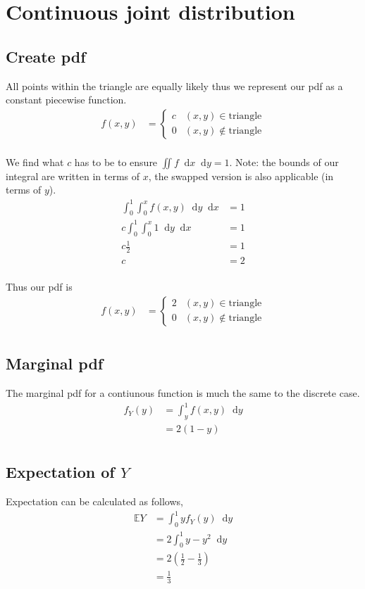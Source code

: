 \documentclass{article}
\newcommand{\diff}{\mathop{}\!\mathrm{d}}
\newcommand{\expect}{\mathbb{E}}
\begin{document}
\section{Continuous joint distribution}
\subsection{Create pdf}
All points within the triangle are equally likely thus we represent our
pdf as a constant piecewise function.
\begin{align*}
    f(x,y)
    &=
    \begin{cases}
        c & (x,y) \in \text{triangle} \\
        0 & (x,y) \notin \text{triangle}
    \end{cases} \\
\end{align*}

We find what $c$ has to be to ensure $\iint f \diff x \diff y = 1$.
Note: the bounds of our integral are written in terms of $x$, the swapped
version is also applicable (in terms of $y$).
\begin{align*}
    \int_0^1 \int_0^x f(x,y) \diff y \diff x &= 1 \\
    c \int_0^1 \int_0^x 1 \diff y \diff x &= 1 \\
    c \frac{1}{2} &= 1 \\
    c &= 2 \\
\end{align*}

Thus our pdf is 
\begin{align*}
    f(x,y)
    &=
    \begin{cases}
        2 & (x,y) \in \text{triangle} \\
        0 & (x,y) \notin \text{triangle}
    \end{cases} \\
\end{align*}

\subsection{Marginal pdf}
The marginal pdf for a contiunous function is much the same to the discrete
case.
\begin{align*}
    f_Y(y) &= \int_y^1 f(x,y) \diff y \\
    &= 2(1-y) \\
\end{align*}

\subsection{Expectation of $Y$}
Expectation can be calculated as follows,
\begin{align*}
    \expect Y &= \int_0^1 y f_Y(y) \diff y \\
    &= 2 \int_0^1 y - y^2 \diff y \\
    &= 2 \left(\frac{1}{2} - \frac{1}{3}\right) \\
    &= \frac{1}{3}
\end{align*}
\end{document}
